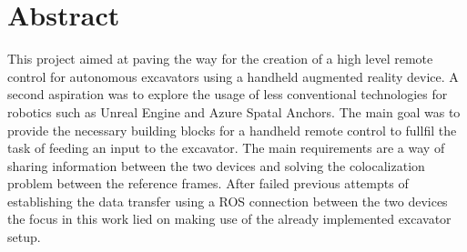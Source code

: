 \chapter*{Abstract}


This project aimed at paving the way for the creation of a high level remote control for autonomous excavators using a handheld augmented reality device. A second aspiration was to explore the usage of less conventional technologies for robotics such as Unreal Engine and Azure Spatal Anchors. The main goal was to provide the necessary building blocks for a handheld remote control to fullfil the task of feeding an input to the excavator. The main requirements are a way of sharing information between the two devices and solving the colocalization problem between the reference frames. After failed previous attempts of establishing the data transfer using a ROS connection between the two devices the focus in this work lied on making use of the already implemented excavator setup.